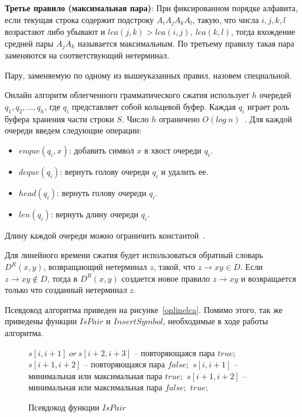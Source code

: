 \documentclass[12pt,a4paper]{extarticle}
\theoremstyle{break}
\begin{document}
\textbf{Третье правило (максимальная пара)}: При фиксированном порядке
алфавита, если текущая строка содержит подстроку $A_iA_jA_kA_l$, такую, что
числа $i,j,k,l$ возрастают либо убывают и $lca(j,k) > lca(i,j),\ lca(k,l)$,
тогда вхождение средней пары $A_jA_k$ называется максимальным. По третьему
правилу такая пара заменяются на соответствующий нетерминал.

Пару, заменяемую по одному из вышеуказанных правил, назовем специальной.

Онлайн алгоритм облегченного грамматического сжатия использует $h$ очередей
$q_1, q_2, \ldots, q_h$, где $q_i$ представляет собой кольцевой буфер. Каждая
$q_i$ играет роль буфера хранения части строки $S$.
Число $h$ ограничено $O(log\ n)$~\cite{lca}. Для каждой очереди введем следующие
операции:
\begin{itemize}
\item $enque(q_i,x)$: добавить символ $x$ в хвост очереди $q_i$.
\item $deque(q_i)$: вернуть голову очереди $q_i$ и удалить ее.
\item $head(q_i)$: вернуть голову очереди $q_i$.
\item $len(q_i)$: вернуть длину очереди $q_i$.
\end{itemize}
Длину каждой очереди можно ограничить константой~\cite{lca}.

Для линейного времени сжатия будет использоваться обратный словарь $D^R(x,y)$,
возвращающий нетерминал $z$, такой, что $z \rightarrow xy \in D$. Если $z
\rightarrow xy \notin D$, тогда в $D^R(x,y)$ создается новое правило
$z \rightarrow xy$ и возвращается только что созданный нетерминал $z$.

Псевдокод алгоритма приведен на рисунке~\ref{onlinelca}. Помимо этого, так же
приведены функции $IsPair$ и $InsertSymbol$, необходимые в ходе работы
алгоритма.

\begin{figure}[!h]
	\begin{center}
	  \begin{varwidth}{\linewidth}
		\begin{codebox}
				\li \If $s[i, i+1]\ or\ s[i+2, i+3]$ -- повторяющаяся пара
				\li 	\Then \Return $true;$
				\End
				\li	\If $s[i+1, i+2]$ -- повторяющаяся пара
				\li		\Then \Return $false;$
				\End
				\li \If $s[i, i+1]$ -- минимальная или максимальная пара 
				\li 	\Then \Return $true;$
				\End
				\li \If $s[i+1, i+2]$ -- минимальная или максимальная пара 
				\li		\Then \Return $false;$
				\End
				\li		\Return $true;$
		\end{codebox}
		\caption{Псевдокод функции $IsPair$}
		\label{ispair}
	  \end{varwidth}
	\end{center}
\end{figure}		
\end{document}
